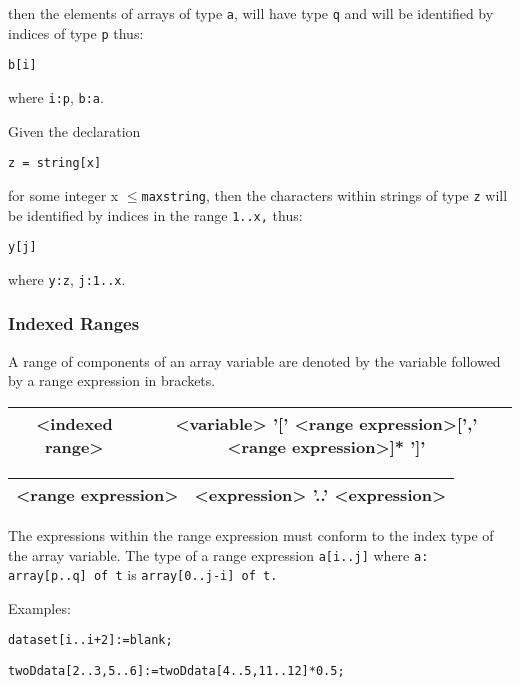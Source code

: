 {then the elements of arrays of type \texttt{a}, will have type \texttt{q} and
will be identified by indices of type \texttt{p} thus:

\texttt{b{[}i{]}}

where \texttt{i:p}, \texttt{b:a}.

Given the declaration

\texttt{z = string{[}x{]}}

for some integer x \texttt{$ \leq  $maxstring}, then the characters within
strings of type \texttt{z} will be identified by indices in
the range \texttt{1..x,} thus:

\texttt{y{[}j{]}}

where \texttt{y:z}, \texttt{j:1..x}.


\subsubsection{Indexed Ranges}

A range of components of an array variable are denoted by the variable followed
by a range expression in brackets.

\vspace{0.3cm}
{\centering \begin{tabular}{|c|c|}
\hline 
<indexed range>&
<variable> '{[}' <range expression>{[}',' <range expression>{]}{*} '{]}'\\
\hline 
\end{tabular}\par}
\vspace{0.3cm}

\vspace{0.3cm}
{\centering \begin{tabular}{|c|c|}
\hline 
<range expression>&
<expression> '..' <expression>\\
\hline 
\end{tabular}\par}
\vspace{0.3cm}

The expressions within the range expression must conform to the
index type of the array variable. The type of a range expression \texttt{a{[}i..j{]}}
where \texttt{a: array{[}p..q{]} of t} is \texttt{array{[}0..j-i{]} of t.}

Examples:

\texttt{dataset{[}i..i+2{]}:=blank;}

\texttt{twoDdata{[}2..3,5..6{]}:=twoDdata{[}4..5,11..12{]}{*}0.5;}

}
